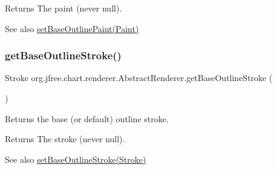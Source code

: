 \begin{DoxyReturn}{Returns}
The paint (never {\ttfamily null}).
\end{DoxyReturn}
\begin{DoxySeeAlso}{See also}
\mbox{\hyperlink{classorg_1_1jfree_1_1chart_1_1renderer_1_1_abstract_renderer_ab1a850a60c44c51d4cbaa83c294b2f86}{set\+Base\+Outline\+Paint(\+Paint)}} 
\end{DoxySeeAlso}
\mbox{\label{classorg_1_1jfree_1_1chart_1_1renderer_1_1_abstract_renderer_a8a73309c5c596b38434a7c3cbbc6f8e3}} 
\subsubsection{\texorpdfstring{get\+Base\+Outline\+Stroke()}{getBaseOutlineStroke()}}
{\footnotesize\ttfamily Stroke org.\+jfree.\+chart.\+renderer.\+Abstract\+Renderer.\+get\+Base\+Outline\+Stroke (\begin{DoxyParamCaption}{ }\end{DoxyParamCaption})}

Returns the base (or default) outline stroke.

\begin{DoxyReturn}{Returns}
The stroke (never {\ttfamily null}).
\end{DoxyReturn}
\begin{DoxySeeAlso}{See also}
\mbox{\hyperlink{classorg_1_1jfree_1_1chart_1_1renderer_1_1_abstract_renderer_a8626e74d5ba48c73c39af03b289ea7a0}{set\+Base\+Outline\+Stroke(\+Stroke)}} 
\end{DoxySeeAlso}
\mbox{\label{classorg_1_1jfree_1_1chart_1_1renderer_1_1_abstract_renderer_a856d21345f9547c9ea9666db2c4928a2}} 
